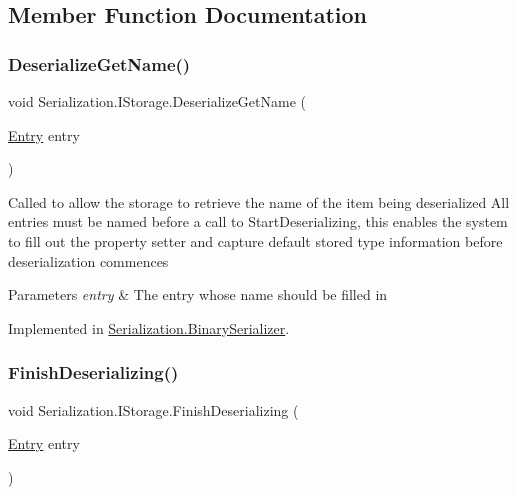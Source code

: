 \subsection{Member Function Documentation}
\mbox{\label{interface_serialization_1_1_i_storage_ad17a92256ad7a7196084e05bad968567}} 
\subsubsection{\texorpdfstring{Deserialize\+Get\+Name()}{DeserializeGetName()}}
{\footnotesize\ttfamily void Serialization.\+I\+Storage.\+Deserialize\+Get\+Name (\begin{DoxyParamCaption}\item[{\hyperlink{class_serialization_1_1_entry}{Entry}}]{entry }\end{DoxyParamCaption})}



Called to allow the storage to retrieve the name of the item being deserialized All entries must be named before a call to Start\+Deserializing, this enables the system to fill out the property setter and capture default stored type information before deserialization commences 


\begin{DoxyParams}{Parameters}
{\em entry} & The entry whose name should be filled in\\
\hline
\end{DoxyParams}


Implemented in \hyperlink{class_serialization_1_1_binary_serializer_ac02802eda1961199b7e91adce7c33de7}{Serialization.\+Binary\+Serializer}.

\mbox{\label{interface_serialization_1_1_i_storage_a8377dea6764882fb9882d0bd92e03de6}} 
\subsubsection{\texorpdfstring{Finish\+Deserializing()}{FinishDeserializing()}}
{\footnotesize\ttfamily void Serialization.\+I\+Storage.\+Finish\+Deserializing (\begin{DoxyParamCaption}\item[{\hyperlink{class_serialization_1_1_entry}{Entry}}]{entry }\end{DoxyParamCaption})}




